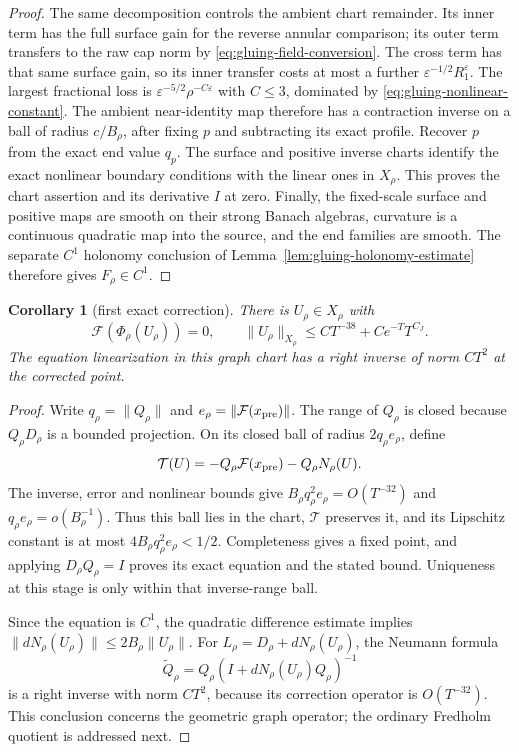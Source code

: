 \documentclass[11pt]{amsart}
\newtheorem{corollary}[theorem]{Corollary}
\theoremstyle{definition}
\theoremstyle{remark}
\theoremstyle{plain}
\begin{document}
\begin{proof}
The same decomposition controls the ambient chart remainder.
Its inner term has the full surface gain for the reverse annular
comparison; its outer term transfers to the raw cap norm by
\eqref{eq:gluing-field-conversion}. The cross term has that same
surface gain, so its inner transfer costs at most a further
$\varepsilon^{-1/2}R_1^\varepsilon$. The largest fractional
loss is $\varepsilon^{-5/2}\rho^{-C\varepsilon}$ with
$C\leq3$, dominated by \eqref{eq:gluing-nonlinear-constant}.
The ambient near-identity map therefore has a contraction inverse
on a ball of radius $c/B_\rho$, after fixing $p$ and subtracting
its exact profile. Recover $p$ from the exact end value $q_p$.
The surface and positive inverse charts identify the exact nonlinear
boundary conditions with the linear ones in $X_\rho$. This
proves the chart assertion and its derivative $I$ at zero.
Finally, the fixed-scale surface and positive maps are smooth on
their strong Banach algebras, curvature is a continuous quadratic
map into the source, and the end families are smooth. The separate
$C^1$ holonomy conclusion of Lemma~\ref{lem:gluing-holonomy-estimate}
therefore gives $F_\rho\in C^1$.
\end{proof}

\begin{corollary}[first exact correction]\label{cor:gluing-first-correction}
There is $U_\rho\in X_\rho$ with
\begin{equation}\label{eq:gluing-first-correction}
 \mathcal F(\Phi_\rho(U_\rho))=0,\qquad
 \|U_\rho\|_{X_\rho}\leq CT^{-38}+Ce^{-T}T^{C_J}.
\end{equation}
The equation linearization in this graph chart has a right inverse
of norm $CT^2$ at the corrected point.
\end{corollary}

\begin{proof}
Write $q_\rho=\|Q_\rho\|$ and
$e_\rho=\|\mathcal F(x_{\rm pre})\|$. The range of $Q_\rho$
is closed because $Q_\rho D_\rho$ is a bounded projection.
On its closed ball of radius $2q_\rho e_\rho$, define
\[
                \mathcal T(U)=-Q_\rho\mathcal F(x_{\rm pre})-Q_\rho N_\rho(U).
\]
The inverse, error and nonlinear bounds give
$B_\rho q_\rho^2e_\rho=O(T^{-32})$ and
$q_\rho e_\rho=o(B_\rho^{-1})$. Thus this ball lies in the
chart, $\mathcal T$ preserves it, and its Lipschitz constant is
at most $4B_\rho q_\rho^2e_\rho<1/2$. Completeness gives
a fixed point, and applying $D_\rho Q_\rho=I$ proves its
exact equation and the stated bound. Uniqueness at this stage is
only within that inverse-range ball.

Since the equation is $C^1$, the quadratic difference estimate
implies $\|dN_\rho(U_\rho)\|\leq2B_\rho\|U_\rho\|$.
For $L_\rho=D_\rho+dN_\rho(U_\rho)$, the Neumann formula
\begin{equation}\label{eq:gluing-corrected-geometric-inverse}
 \widetilde Q_\rho=Q_\rho(I+dN_\rho(U_\rho)Q_\rho)^{-1}
\end{equation}
is a right inverse with norm $CT^2$, because its correction
operator is $O(T^{-32})$. This conclusion concerns the geometric
graph operator; the ordinary Fredholm quotient is addressed next.
\end{proof}
\end{document}

